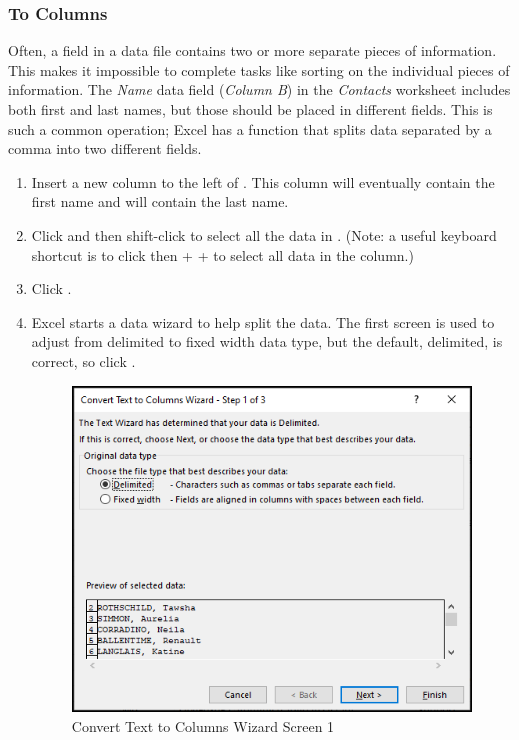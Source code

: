 \subsubsection{To Columns}

Often, a field in a data file contains two or more separate pieces of information. This makes it impossible to complete tasks like sorting on the individual pieces of information. The \textit{Name} data field (\textit{Column B}) in the \textit{Contacts} worksheet includes both first and last names, but those should be placed in different fields. This is such a common operation; Excel has a function that splits data separated by a comma into two different fields.

\begin{enumerate}
	\item Insert a new column to the left of . This column will eventually contain the first name and  will contain the last name.
	\item Click  and then shift-click  to select all the data in . (Note: a useful keyboard shortcut is to click  then  +  +  to select all data in the column.)
	\item Click .
	\item Excel starts a data wizard to help split the data. The first screen is used to adjust from delimited to fixed width data type, but the default, delimited, is correct, so click .
	
	\begin{figure}[H]
		\centering
		\includegraphics[width=\maxwidth{.75\linewidth}]{gfx/ch09_fig30}
		\caption{Convert Text to Columns Wizard Screen 1}
		\label{09:fig30}
	\end{figure}


\end{enumerate}
